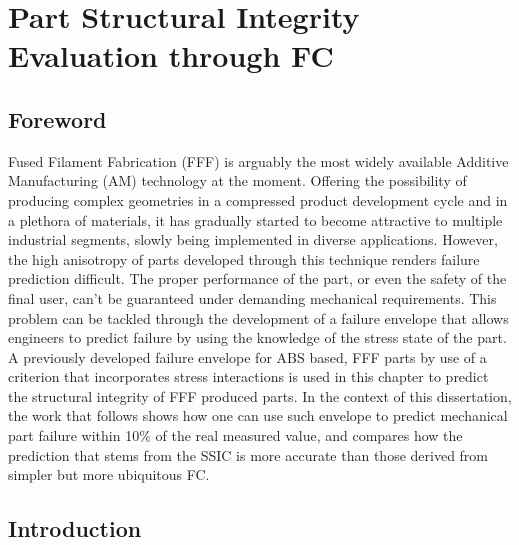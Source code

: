 \documentclass[main.tex]{subfiles}
\begin{document}
\chapter{Part Structural Integrity Evaluation through FC} \label{ch:fc_val}
\section{Foreword}
Fused Filament Fabrication (FFF) is arguably the most widely available Additive Manufacturing (AM) technology at the moment. Offering the possibility of producing complex geometries in a compressed product development cycle and in a plethora of materials, it has gradually started to become attractive to multiple industrial segments, slowly being implemented in diverse applications. However, the high anisotropy of parts developed through this technique renders failure prediction difficult. The proper performance of the part, or even the safety of the final user, can't be guaranteed under demanding mechanical requirements. This problem can be tackled through the development of a failure envelope that allows engineers to predict failure by using the knowledge of the stress state of the part. A previously developed failure envelope for ABS based, FFF parts by use of a criterion that incorporates stress interactions is used in this chapter to predict the structural integrity of FFF produced parts. In the context of this dissertation, the work that follows shows how one can use such envelope to predict mechanical part failure within 10\% of the real measured value, and compares how the prediction that stems from the SSIC is more accurate than those derived from simpler but more ubiquitous FC.

\section{Introduction}\label{sec:SSIC_intr}
\end{document}
